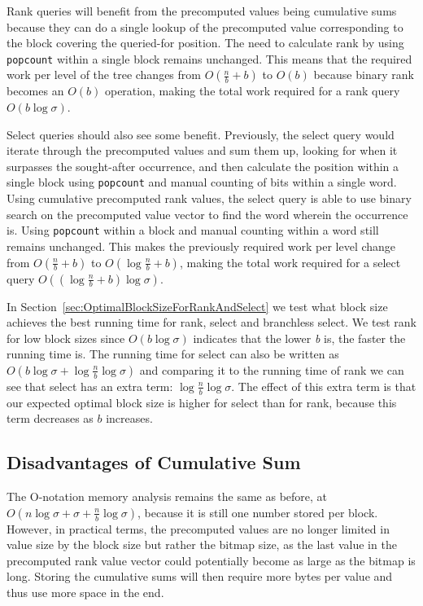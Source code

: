 Rank queries will benefit from the precomputed values being cumulative sums because they can do a single lookup of the precomputed value corresponding to the block covering the queried-for position.
The need to calculate rank by using \texttt{popcount} within a single block remains unchanged.
This means that the required work per level of the tree changes from $O(\frac{n}{b}+b)$ to $O(b)$ because binary rank becomes an $O(b)$ operation, making the total work required for a rank query $O(b \log \sigma)$.

Select queries should also see some benefit.
Previously, the select query would iterate through the precomputed values and sum them up, looking for when it surpasses the sought-after occurrence, and then calculate the position within a single block using \texttt{popcount} and manual counting of bits within a single word.
Using cumulative precomputed rank values, the select query is able to use binary search on the precomputed value vector to find the word wherein the occurrence is.
Using \texttt{popcount} within a block and manual counting within a word still remains unchanged.
This makes the previously required work per level change from $O(\frac{n}{b} + b)$ to $O(\log \frac{n}{b} + b)$, making the total work required for a select query $O((\log \frac{n}{b} + b) \log \sigma)$.

In Section~\ref{sec:OptimalBlockSizeForRankAndSelect} we test what block size achieves the best running time for rank, select and branchless select.
We test rank for low block sizes since $O(b \log \sigma)$ indicates that the lower \textit{b} is, the faster the running time is.
The running time for select can also be written as $O(b \log \sigma + \log \frac{n}{b} \log \sigma)$ and comparing it to the running time of rank we can see that select has an extra term: $\log \frac{n}{b} \log \sigma$.
The effect of this extra term is that our expected optimal block size is higher for select than for rank, because this term decreases as $b$ increases.

\subsection{Disadvantages of Cumulative Sum}
The O-notation memory analysis remains the same as before, at $O(n \log \sigma + \sigma + \frac{n}{b} \log \sigma)$, because it is still one number stored per block.
However, in practical terms, the precomputed values are no longer limited in value size by the block size but rather the bitmap size, as the last value in the precomputed rank value vector could potentially become as large as the bitmap is long.
Storing the cumulative sums will then require more bytes per value and thus use more space in the end.


